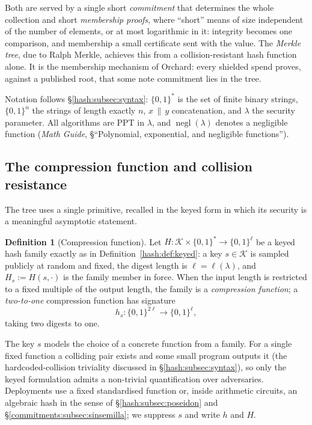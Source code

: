 \documentclass[11pt,a4paper]{article}
\theoremstyle{definition}
\newtheorem{definition}[theorem]{Definition}
\theoremstyle{remark}
\DeclareMathOperator{\negl}{negl}
\begin{document}
Both are served by a single short \emph{commitment} that determines the
whole collection and short \emph{membership proofs}, where ``short''
means of size independent of the number of elements, or at most
logarithmic in it: integrity becomes one comparison, and membership a
small certificate sent with the value. The \emph{Merkle tree}, due to
Ralph Merkle, achieves this from a collision-resistant hash function
alone. It is the membership mechanism of Orchard: every shielded spend
proves, against a published root, that some note commitment lies in the
tree.

Notation follows \S\ref{hash:subsec:syntax}: \(\{0,1\}^{*}\) is the set
of finite binary strings, \(\{0,1\}^{n}\) the strings of length exactly
\(n\), \(x \,\|\, y\) concatenation, and \(\lambda\) the security
parameter. All algorithms are PPT in \(\lambda\), and
\(\negl(\lambda)\) denotes a negligible function (\emph{Math Guide},
\S``Polynomial, exponential, and negligible functions'').

\subsection{The compression function and collision resistance}
\label{merkle:sec-compression}

The tree uses a single primitive, recalled in the keyed form in which
its security is a meaningful asymptotic statement.

\begin{definition}[Compression function]
\label{merkle:def-compression}
Let \(H \colon \mathcal{K} \times \{0,1\}^{*} \to \{0,1\}^{\ell}\) be
a keyed hash family exactly as in Definition~\ref{hash:def:keyed}: a
key \(s \in \mathcal{K}\) is sampled publicly at random and fixed,
the digest length is \(\ell = \ell(\lambda)\), and
\(H_{s} := H(s, \cdot)\) is the family member in force. When the
input length is restricted to a fixed multiple of the output length,
the family is a \emph{compression function}; a \emph{two-to-one}
compression function has signature
\[
h_{s} \colon \{0,1\}^{2\ell} \longrightarrow \{0,1\}^{\ell},
\]
taking two digests to one.
\end{definition}

The key \(s\) models the choice of a concrete function from a family.
For a single fixed function a colliding pair exists and some small
program outputs it (the hardcoded-collision triviality discussed in
\S\ref{hash:subsec:syntax}), so only the keyed formulation admits a
non-trivial quantification over adversaries. Deployments use a fixed
standardised function or, inside arithmetic circuits, an algebraic hash
in the sense of \S\ref{hash:subsec:poseidon} and
\S\ref{commitments:subsec:sinsemilla}; we suppress \(s\) and write \(h\)
and \(H\).
\end{document}
